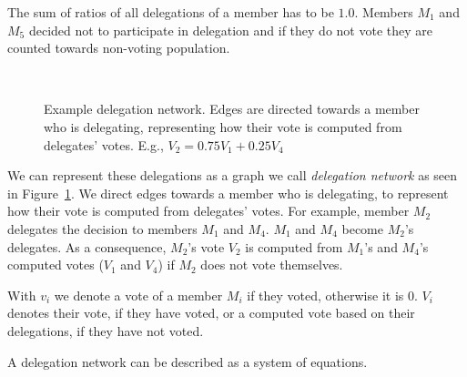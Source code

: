 \documentclass{sigchi}
\begin{document}
The sum of ratios of all delegations of a member has to be $1.0$.
Members $M_1$ and $M_5$ decided not to participate in delegation and if they do not vote they are
counted towards non-voting population.

\begin{figure}
  \centering
  \caption{Example delegation network. Edges are directed towards a member who is delegating, representing how their
  vote is computed from delegates' votes. E.g., $V_2 = 0.75 V_1 + 0.25 V_4$}~\label{fig:delegation-network}
\end{figure}

We can represent these delegations as a graph we call \emph{delegation network} as seen in
Figure~\ref{fig:delegation-network}.
We direct edges towards a member who is delegating, to represent how their vote is computed from delegates' votes.
For example, member $M_2$ delegates the decision to members $M_1$ and $M_4$.
$M_1$ and $M_4$ become $M_2$'s delegates.
As a consequence, $M_2$'s vote $V_2$ is computed from $M_1$'s and $M_4$'s computed votes ($V_1$ and $V_4$)
if $M_2$ does not vote themselves.

With $v_i$ we denote a vote of a member $M_i$ if they voted, otherwise it is $0$.
$V_i$ denotes their vote, if they have voted, or a computed vote based on their delegations, if they have not voted.

A delegation network can be described as a system of equations.

\end{document}
